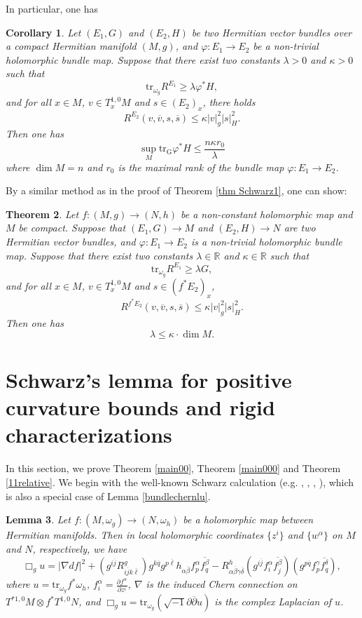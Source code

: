 \documentclass[12pt]{amsart}
\theoremstyle{plain}
\newtheorem{thm}{Theorem}[section]
\newtheorem{lemma}[thm]{Lemma}
\newtheorem{cor}[thm]{Corollary}
\theoremstyle{definition}
\newcommand{\btheorem}{\begin{thm}}
\newcommand{\etheorem}{\end{thm}}
\newcommand{\bcorollary}{\begin{cor}}
\newcommand{\ecorollary}{\end{cor}}
\newcommand{\elemma}{\end{lemma}}
\newcommand{\blemma}{\begin{lemma}}
\renewcommand{\bar}{\overline}
\renewcommand{\phi}{\varphi}
\newcommand{\beq}{\begin{equation}}
\newcommand{\eeq}{\end{equation}}
\renewcommand{\>}{\rightarrow}
\newcommand{\R}{{\mathbb R}}
\newcommand{\om}{\omega}
\numberwithin{equation}{section} %
\begin{document}
\baselineskip
\noindent In particular, one has

\bcorollary Let
$(E_1,G)$ and  $(E_2,H)$ be two  Hermitian  vector bundles over  a compact Hermitian manifold $(M,g)$,
and $\phi:E_1\to E_2$ be  a non-trivial holomorphic bundle map. Suppose that there exist two constants $\lambda>0$ and $\kappa>0$ such that
\beq
\mathrm{tr}_{\om_g}R^{E_1}\ge \lambda \phi^*H,
\eeq
and for all $x\in M$, $v\in T_x^{1,0}M$ and $s\in (E_2)_x$, there holds
\beq
R^{E_2}\left(v,\bar v, s,\bar s\right)\le \kappa|v|_g^2|s|_H^2.
\eeq Then one has
\beq
\sup_M \mathrm{tr_G}\phi^* H\le \frac{ n\kappa r_0}{\lambda}
\eeq
where $\dim M=n$ and $r_0$ is the maximal rank of the bundle map $\phi: E_1\>E_2$.
\ecorollary

 
\noindent By a similar method as in the proof of Theorem \ref{thm Schwarz1}, one can show: 
\btheorem\label{thm Schwarz2} Let $f:(M,g)\>(N,h)$ be a non-constant holomorphic map and $M$ be compact. Suppose that
$(E_1,G)\>M$ and  $(E_2,H)\>N$  are two Hermitian vector bundles, and $\phi:E_1\to E_2$ is  a non-trivial holomorphic bundle map. Suppose that there exist two constants $\lambda\in \R$ and $\kappa\in \R$ such that
\beq
\mathrm{tr}_{\om_g}R^{E_1}\ge \lambda G,
\eeq
and for all $x\in M$, $v\in T_x^{1,0}M$ and $s\in  (f^*E_2)_x$,
\beq
R^{f^*E_2}\left(v,\bar v, s,\bar s\right)\le \kappa|v|_g^2|s|_H^2.
\eeq Then one has
\beq
\lambda \le \kappa\cdot \dim M.
\eeq
\etheorem





\baselineskip

\section{Schwarz's lemma for positive curvature bounds and rigid characterizations}
In this section,  we prove Theorem \ref{main00},  Theorem \ref{main000} and Theorem \ref{11relative}.
We begin with the well-known Schwarz calculation (e.g. \cite{Che68}, \cite{Lu68}, \cite{Yau78}, \cite{Yan18}), which is also a special case of Lemma \ref{bundlechernlu}.
\blemma\label{lem Schwarz calculation}
    Let $f:(M,\om_g)\rightarrow (N,\om_h)$ be a holomorphic map between Hermitian manifolds.
    Then in  local holomorphic coordinates $\{z^i\}$ and $\{w^\alpha\}$ on $M$ and $N$, respectively, we have
    \beq
        \Box_g u = |\nabla df|^2
        +\left(g^{i\bar j} R^g_{i\bar j k\bar \ell} \right)g^{k\bar q} g^{p\bar \ell} h_{\alpha\bar\beta} f^{\alpha }_p \bar{f^\beta_q}
        - R^h_{\alpha\bar\beta\gamma\bar\delta}\left(g^{i\bar j} f^{\alpha}_i \bar{f^{\beta}_j} \right)  \left(g^{p\bar q}  f^\gamma_p \bar{f^\delta_q} \right), \label{Schwarz0}
    \eeq
    where $u=\mathrm{tr}_{\omega_g} f^*\omega_h $, $f^{\alpha}_i = \frac{\partial f^{\alpha } } {\partial z^i}$,
    $\nabla$ is the induced Chern connection on  $T^{*1,0}M\otimes f^*T^{1,0}N$,
    and $\Box_g u= \mathrm{tr}_{\omega_g} (\sqrt{-1}\partial \bar{\partial }u )$ is the complex Laplacian of $u$.
\elemma
\end{document}
